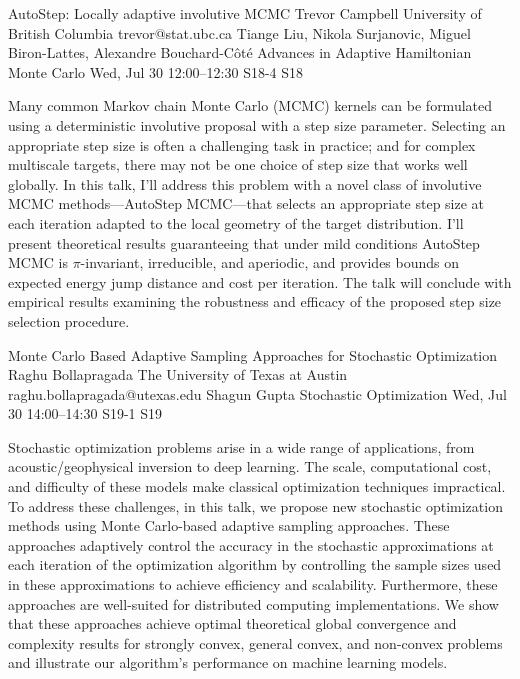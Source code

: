 \documentclass[12pt,lettersize,oneside]{book} %
\begin{document}
\begin{talk}
  {AutoStep: Locally adaptive involutive MCMC}%
  {Trevor Campbell}%
  {University of British Columbia}%
  {trevor@stat.ubc.ca}%
  {Tiange Liu, Nikola Surjanovic, Miguel Biron-Lattes, Alexandre Bouchard-C\^ot\'e}%
  {Advances in Adaptive Hamiltonian Monte Carlo}%
  {Wed, Jul 30 12:00--12:30}%
  {S18-4}%
  {S18}%
    

\medskip

Many common Markov chain Monte Carlo (MCMC) kernels can be formulated using a deterministic involutive proposal with a step size parameter.  Selecting an appropriate step size is often a challenging task in practice; and for complex multiscale targets, there may not be one choice of step size that works well globally.  In this talk, I'll address this problem with a novel class of involutive MCMC methods---AutoStep MCMC---that selects an appropriate step size at each iteration adapted to the local geometry of the target distribution.  I'll present theoretical results guaranteeing that under mild conditions AutoStep MCMC is $\pi$-invariant, irreducible, and aperiodic, and provides bounds on expected energy jump distance and cost per iteration. The talk will conclude with empirical results examining the robustness and efficacy of the proposed step size selection procedure.

\end{talk}

\begin{talk}
  {Monte Carlo Based Adaptive Sampling Approaches for Stochastic Optimization}%
  {Raghu Bollapragada}%
  {The University of Texas at Austin}%
  {raghu.bollapragada@utexas.edu}%
  {Shagun Gupta}%
  {Stochastic Optimization}%
  {Wed, Jul 30 14:00--14:30}%
  {S19-1}%
  {S19}%
    
   
Stochastic optimization problems arise in a wide range of applications, from acoustic/geophysical inversion to deep learning. The scale, computational cost, and difficulty of these models make classical optimization techniques impractical. To address these challenges, in this talk, we propose new stochastic optimization methods using Monte Carlo-based adaptive sampling approaches. These approaches adaptively control the accuracy in the stochastic approximations at each iteration of the optimization algorithm by controlling the sample sizes used in these approximations to achieve efficiency and scalability. Furthermore, these approaches are well-suited for distributed computing implementations. We show that these approaches achieve optimal theoretical global convergence and complexity results for strongly convex, general convex, and non-convex problems and illustrate our algorithm's performance on machine learning models.

\medskip

\end{talk}
\end{document}
